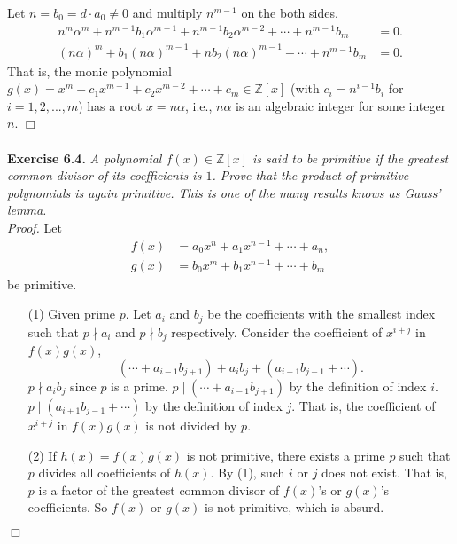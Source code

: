 \documentclass{article}
\begin{document}
Let $n = b_0 = d \cdot a_0 \neq 0$ and multiply $n^{m-1}$ on the both sides.
\begin{align*}
n^m \alpha^m + n^{m-1} b_1 \alpha^{m-1} + n^{m-1} b_2 \alpha^{m-2} + \cdots + n^{m-1} b_m &= 0. \\
(n\alpha)^m + b_1 (n\alpha)^{m-1} + n b_2 (n\alpha)^{m-1} + \cdots + n^{m-1} b_m &= 0.
\end{align*}
That is, the monic polynomial
$g(x) = x^m + c_1 x^{m-1} + c_2 x^{m-2} + \cdots + c_m \in \mathbb{Z}[x]$
(with $c_i = n^{i - 1} b_i$ for $i = 1, 2, ..., m$)
has a root $x = n\alpha$, i.e.,
$n\alpha$ is an algebraic integer for some integer $n$.
$\Box$ \\\\



\textbf{Exercise 6.4.}
\emph{A polynomial $f(x) \in \mathbb{Z}[x]$ is said to be primitive
if the greatest common divisor of its coefficients is $1$.
Prove that the product of primitive polynomials is again primitive.
This is one of the many results knows as Gauss' lemma.} \\

\emph{Proof.}
Let
\begin{align*}
f(x) &= a_0 x^n + a_1 x^{n-1} + \cdots + a_n, \\
g(x) &= b_0 x^m + b_1 x^{n-1} + \cdots + b_m
\end{align*}
be primitive.
\begin{enumerate}
\item[(1)]
Given prime $p$.
Let $a_i$ and $b_j$ be the coefficients with the smallest index such that
$p \nmid a_i$ and $p \nmid b_j$ respectively.
Consider the coefficient of $x^{i+j}$ in $f(x)g(x)$,
$$(\cdots + a_{i-1} b_{j+1}) + a_i b_j + (a_{i+1} b_{j-1} + \cdots).$$
$p \nmid a_i b_j$ since $p$ is a prime.
$p \mid (\cdots + a_{i-1} b_{j+1})$ by the definition of index $i$.
$p \mid (a_{i+1} b_{j-1} + \cdots)$ by the definition of index $j$.
That is, the coefficient of $x^{i+j}$ in $f(x)g(x)$ is not divided by $p$.
\item[(2)]
If $h(x) = f(x)g(x)$ is not primitive,
there exists a prime $p$ such that $p$ divides all coefficients of $h(x)$.
By (1), such $i$ or $j$ does not exist.
That is, $p$ is a factor of the greatest common divisor of $f(x)$'s or $g(x)$'s coefficients.
So $f(x)$ or $g(x)$ is not primitive, which is absurd.
\end{enumerate}
$\Box$ \\\\
\end{document}
